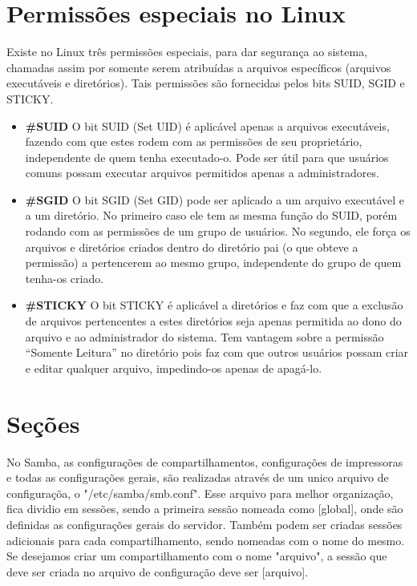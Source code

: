
\section{Permissões especiais no Linux}

Existe no Linux três permissões especiais, para dar segurança ao sistema, chamadas assim por somente serem atribuídas a arquivos específicos (arquivos executáveis e diretórios). Tais permissões são fornecidas pelos bits SUID, SGID e STICKY.

  \begin{itemize}
    \item \textbf{\#SUID} O bit SUID (Set UID) é aplicável apenas a arquivos executáveis, fazendo com que estes rodem com as permissões de seu proprietário, independente de quem tenha executado-o. Pode ser útil para que usuários comuns possam executar arquivos permitidos apenas a administradores.

    \item \textbf{\#SGID} O bit SGID (Set GID) pode ser aplicado a um arquivo executável e a um diretório. No primeiro caso ele tem as mesma função do SUID, porém rodando com as permissões de um grupo de usuários. No segundo, ele força os arquivos e diretórios criados dentro do diretório pai (o que obteve a permissão) a pertencerem ao mesmo grupo, independente do grupo de quem tenha-os criado.

    \item \textbf{\#STICKY} O bit STICKY é aplicável a diretórios e faz com que a exclusão de arquivos pertencentes a estes diretórios seja apenas permitida ao dono do arquivo e ao administrador do sistema. Tem vantagem sobre a permissão “Somente Leitura” no diretório pois faz com que outros usuários possam criar e editar qualquer arquivo, impedindo-os apenas de apagá-lo.
  \end{itemize}

\section{Seções}

No Samba, as configurações de compartilhamentos, configurações de impressoras e todas as configurações gerais, são realizadas através de um unico arquivo de configuraçõa, o "/etc/samba/smb.conf". Esse arquivo para melhor organização, fica dividio em sessões, sendo a primeira sessão nomeada como [global], onde são definidas as configurações gerais do servidor. Também podem ser criadas sessões adicionais para cada compartilhamento, sendo nomeadas com o nome do mesmo. Se desejamos criar um compartilhamento com o nome "arquivo", a sessão que deve ser criada no arquivo de configuração deve ser [arquivo].

